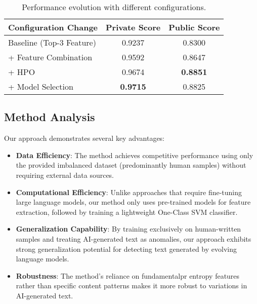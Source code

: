 \begin{table}[h]
\caption{Performance evolution with different configurations.}
\label{performance_evolution}
\vskip 0.15in
\begin{center}
\begin{small}
\begin{tabular}{lcc}
\toprule
\textbf{Configuration Change} & \textbf{Private Score} & \textbf{Public Score} \\
\midrule
Baseline (Top-3 Feature) & 0.9237 & 0.8300 \\
+ Feature Combination & 0.9592 & 0.8647 \\
+ HPO & 0.9674 & \textbf{0.8851} \\
+ Model Selection & \textbf{0.9715} & 0.8825 \\
\bottomrule
\end{tabular}
\end{small}
\end{center}
\vskip -0.1in
\end{table}

\subsection{Method Analysis}
Our approach demonstrates several key advantages:

\begin{itemize}
    \item \textbf{Data Efficiency}: The method achieves competitive performance using only the provided imbalanced dataset (predominantly human samples) without requiring external data sources.
    
    \item \textbf{Computational Efficiency}: Unlike approaches that require fine-tuning large language models, our method only uses pre-trained models for feature extraction, followed by training a lightweight One-Class SVM classifier.
    
    \item \textbf{Generalization Capability}: By training exclusively on human-written samples and treating AI-generated text as anomalies, our approach exhibits strong generalization potential for detecting text generated by evolving language models.
    
    \item \textbf{Robustness}: The method's reliance on fundamentalpr entropy features rather than specific content patterns makes it more robust to variations in AI-generated text.
\end{itemize}

